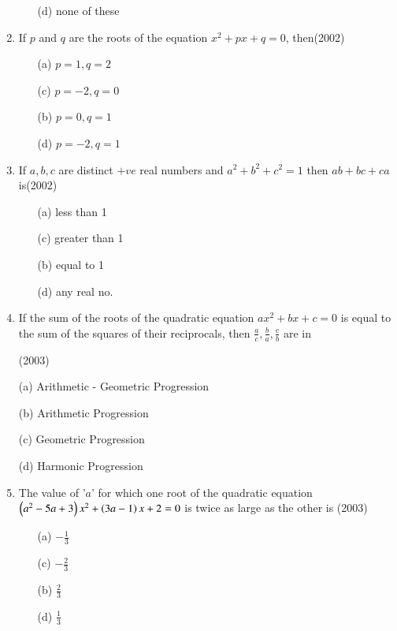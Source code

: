 \documentclass[journal,12pt,twocolumn]{IEEEtran}
\theoremstyle{remark}
\begin{document}
\begin{enumerate}
\begin{multicols}{2}
\begin{enumerate}
\item[(d)] none of these
\end{enumerate}
\end{multicols}
\item 
If $p$ and $q$ are the roots of the equation ${x^{2}+px+q=0}$, then\hfill(2002)
\begin{multicols}{2}
\begin{enumerate}

\item[(a)] $p=1,q=2$

\item[(c)]$p=-2,q=0$

\item[(b)] $p=0,q=1$

\item[(d)] $p=-2,q=1$
\end{enumerate}
\end{multicols}
\item 
If $a,b,c$ are distinct $+ve$ real numbers and ${a^{2}+b^{2}+c^{2}=1}$ then ${ab+bc+ca}$ is\hfill(2002)
\begin{multicols}{2}
\begin{enumerate}

\item[(a)] less than 1

\item[(c)] greater than 1

\item[(b)] equal to 1

\item[(d)] any real no.
\end{enumerate}
\end{multicols}
\item 
If the sum of the roots of the quadratic equation ${ax^{2}+bx+c=0}$ is equal to the sum of the squares of their reciprocals, then $\frac{a}{c},\frac{b}{a},\frac{c}{b}$ are in 

\hfill(2003)

(a) Arithmetic - Geometric Progression

(b) Arithmetic Progression

(c) Geometric Progression

(d) Harmonic Progression
\item 
The value of '$a$' for which one root of the quadratic equation ${\left(a^{2}-5a+3\right)x^{2}+\left(3a-1\right)x+2=0}$ is twice as large as the other is \hfill(2003)
\begin{multicols}{2}

\begin{enumerate}
\item[(a)] $-\frac{1}{3}$

\item[(c)] $-\frac{2}{3}$

\item[(b)] $\frac{2}{3}$

\item[(d)] $\frac{1}{3}$
\end{enumerate}

\end{multicols}

\end{enumerate}
\end{document}
